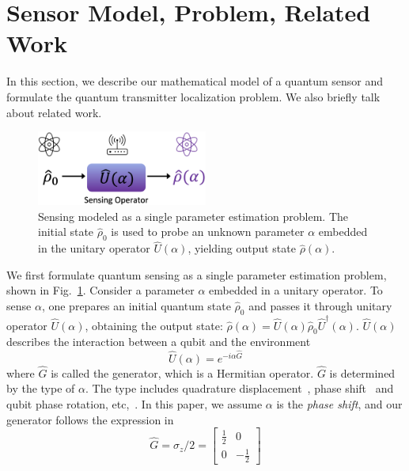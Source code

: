 \section{Sensor Model, Problem, Related Work}
\label{sec:quantum_problem}

In this section, we describe our mathematical model of a quantum sensor and formulate the quantum transmitter localization problem.
We also briefly talk about related work.

\begin{figure}[h]
    \centering
    \includegraphics[width=0.5\textwidth]{chapters/icc/figures/unitary.png}
    \caption{Sensing modeled as a single parameter estimation problem. The initial state $\hat{\rho}_{0}$ is used to probe an unknown parameter $\alpha$ embedded in the unitary operator $\hat{U}(\alpha)$, yielding output state $\hat{\rho}(\alpha)$.}
    \label{fig:unitary}
\end{figure}
 We first formulate quantum sensing as a single parameter estimation problem, shown in Fig.~\ref{fig:unitary}.
Consider a parameter $\alpha$ embedded in a unitary operator.
To sense $\alpha$, one prepares an initial quantum state $\hat{\rho}_{0}$ and passes it through unitary operator $\hat{U}(\alpha)$, obtaining the output state:
$\hat{\rho}(\alpha) = \hat{U}(\alpha) \hat{\rho}_{0} \hat{U}^{\dagger}(\alpha)$.
$\hat{U}(\alpha)$ describes the interaction between a qubit and the environment~\cite{arizona21-thesis}
\begin{equation}
    \hat{U}(\alpha) = e^{-i\alpha \hat{G}}
    \label{equ:unitary_generator}
\end{equation}
where $\hat{G}$ is called the generator, which is a Hermitian operator.
$\hat{G}$ is determined by the type of $\alpha$.
The type includes quadrature displacement~\cite{PRL20-qsn}, phase shift~\cite{nature21_phase} and qubit phase rotation, etc,~\cite{Zhang_2021}. 
In this paper, we assume $\alpha$ is the \emph{phase shift}, and our generator follows the expression in~\cite{nature21_phase}
\begin{equation}
    \hat{G} = \sigma_z / 2 = 
    \begin{bmatrix}
    \frac{1}{2} & 0\\
    0 & -\frac{1}{2}
    \end{bmatrix}
    \label{equ:generator}
\end{equation}
